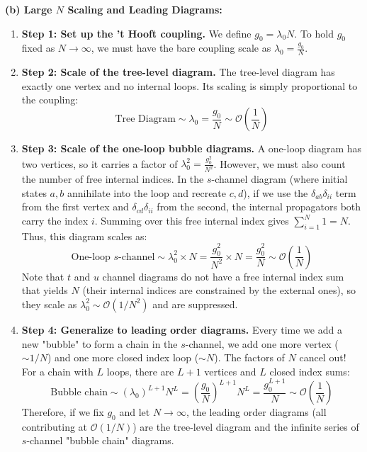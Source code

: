 \begin{solution}
\textbf{(b) Large $N$ Scaling and Leading Diagrams:}
\begin{enumerate}
    \item \textbf{Step 1: Set up the 't Hooft coupling.}
    We define $g_0 = \lambda_0 N$. To hold $g_0$ fixed as $N \to \infty$, we must have the bare coupling scale as $\lambda_0 = \frac{g_0}{N}$.
    
    \item \textbf{Step 2: Scale of the tree-level diagram.}
    The tree-level diagram has exactly one vertex and no internal loops.
    Its scaling is simply proportional to the coupling:
    \[ \text{Tree Diagram} \sim \lambda_0 = \frac{g_0}{N} \sim \mathcal{O}\left(\frac{1}{N}\right) \]
    
    \item \textbf{Step 3: Scale of the one-loop bubble diagrams.}
    A one-loop diagram has two vertices, so it carries a factor of $\lambda_0^2 = \frac{g_0^2}{N^2}$.
    However, we must also count the number of free internal indices. 
    In the $s$-channel diagram (where initial states $a, b$ annihilate into the loop and recreate $c, d$), if we use the $\delta_{ab}\delta_{ii}$ term from the first vertex and $\delta_{cd}\delta_{ii}$ from the second, the internal propagators both carry the index $i$.
    Summing over this free internal index gives $\sum_{i=1}^N 1 = N$.
    Thus, this diagram scales as:
    \[ \text{One-loop } s\text{-channel} \sim \lambda_0^2 \times N = \frac{g_0^2}{N^2} \times N = \frac{g_0^2}{N} \sim \mathcal{O}\left(\frac{1}{N}\right) \]
    Note that $t$ and $u$ channel diagrams do not have a free internal index sum that yields $N$ (their internal indices are constrained by the external ones), so they scale as $\lambda_0^2 \sim \mathcal{O}(1/N^2)$ and are suppressed.
    
    \item \textbf{Step 4: Generalize to leading order diagrams.}
    Every time we add a new "bubble" to form a chain in the $s$-channel, we add one more vertex ($\sim 1/N$) and one more closed index loop ($\sim N$). The factors of $N$ cancel out!
    For a chain with $L$ loops, there are $L+1$ vertices and $L$ closed index sums:
    \[ \text{Bubble chain} \sim (\lambda_0)^{L+1} N^L = \left(\frac{g_0}{N}\right)^{L+1} N^L = \frac{g_0^{L+1}}{N} \sim \mathcal{O}\left(\frac{1}{N}\right) \]
    Therefore, if we fix $g_0$ and let $N \to \infty$, the leading order diagrams (all contributing at $\mathcal{O}(1/N)$) are the tree-level diagram and the infinite series of $s$-channel "bubble chain" diagrams.
\end{enumerate}
\end{solution}
